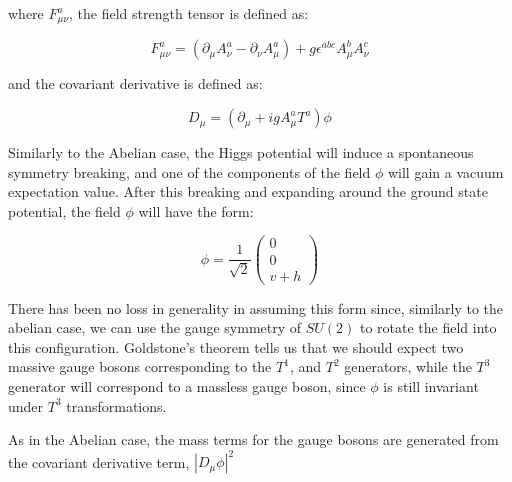\noindent where $F_{\mu\nu}^{a}$, the field strength tensor is
defined as:

\begin{equation}\label{eq:non_abelian_higgs_mechanism_field_strength_tensor}
F_{\mu\nu}^{a} = (\partial_{\mu}A_{\nu}^{a}
- \partial_{\nu}A_{\mu}^{a}) + g\epsilon^{abc}A_{\mu}^{b}A_{\nu}^{c}
\end{equation}

\noindent and the covariant derivative is defined as:

\begin{equation}\label{eq:non_abelian_higgs_mechanism_covariant_derivative}
D_{\mu} = (\partial_{\mu} + igA_{\mu}^{a}T^{a})\phi
\end{equation}

\par Similarly to the Abelian case, the Higgs potential will induce a
spontaneous symmetry breaking, and one of the components of the field
$\phi$ will gain a vacuum expectation value.  After this breaking and
expanding around the ground state potential, the
field $\phi$ will have the form:

\begin{equation}\label{eq:non_abelian_higgs_mechanism_phi_broken}
\phi = \frac{1}{\sqrt{2}}
  \begin{pmatrix}
    0 \\
    0 \\
    v + h
    \end{pmatrix}
\end{equation}

\noindent There has been no loss in generality in assuming this form
since, similarly to the abelian case, we can use the gauge symmetry of
$SU(2)$ to rotate the field into this configuration.  Goldstone's
theorem tells us that we should expect two massive gauge bosons
corresponding to the $T^{1}$, and $T^{2}$ generators, while the
$T^{3}$ generator will correspond to a massless gauge boson, since
$\phi$ is still invariant under $T^{3}$ transformations. 

\par As in the Abelian case, the mass terms for the gauge bosons are
generated from the covariant derivative term, $|D_{\mu}\phi|^{2}$

